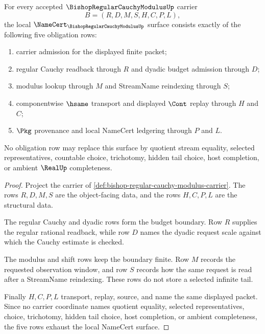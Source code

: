 \begin{theorem}
\label{thm:bishop-regular-cauchy-modulus-namecert-obligations}
For every accepted $\BishopRegularCauchyModulusUp$ carrier
$$
B=(R,D,M,S,H,C,P,L),
$$
the local $\NameCert_{\BishopRegularCauchyModulusUp}$ surface consists exactly of the following five obligation rows:
\begin{enumerate}
\item carrier admission for the displayed finite packet;
\item regular Cauchy readback through $R$ and dyadic budget admission through $D$;
\item modulus lookup through $M$ and StreamName reindexing through $S$;
\item componentwise $\hsame$ transport and displayed $\Cont$ replay through $H$ and $C$;
\item $\Pkg$ provenance and local NameCert ledgering through $P$ and $L$.
\end{enumerate}
No obligation row may replace this surface by quotient stream equality, selected representatives, countable choice, trichotomy, hidden tail choice, host completion, or ambient $\RealUp$ completeness.
\end{theorem}
\begin{proof}
Project the carrier of \autoref{def:bishop-regular-cauchy-modulus-carrier}. The rows $R,D,M,S$ are the object-facing data, and the rows $H,C,P,L$ are the structural data.

The regular Cauchy and dyadic rows form the budget boundary. Row $R$ supplies the regular rational readback, while row $D$ names the dyadic request scale against which the Cauchy estimate is checked.

The modulus and shift rows keep the boundary finite. Row $M$ records the requested observation window, and row $S$ records how the same request is read after a StreamName reindexing. These rows do not store a selected infinite tail.

Finally $H,C,P,L$ transport, replay, source, and name the same displayed packet. Since no carrier coordinate names quotient equality, selected representatives, choice, trichotomy, hidden tail choice, host completion, or ambient completeness, the five rows exhaust the local NameCert surface.
\end{proof}

